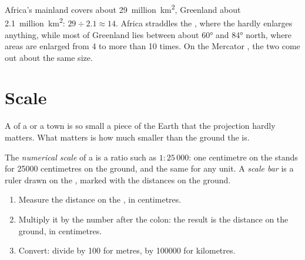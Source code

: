 \begin{example}
Africa's mainland covers about 29~million~\unit{km^2}, Greenland about
2.1~million~\unit{km^2}: $29 \div 2.1 \approx 14$. Africa straddles the
, where the  hardly enlarges anything, while
most of Greenland lies between about \ang{60} and \ang{84} north, where
areas are enlarged from 4 to more than 10 times. On the Mercator , the
two come out about the same size.
\end{example}

\section{Scale}

A  of a  or a town is so small a piece of the Earth that the
projection hardly matters. What matters is how much smaller than the
ground the  is.

\begin{definition}\label{def:g9:maps-of-the-earth:numerical-scale}
The \emph{numerical scale} of a  is a ratio such
as $1 : 25\,000$: one centimetre on the  stands for \num{25000}
centimetres on the ground, and the same for any unit. A \emph{scale
bar} is a ruler drawn on the , marked with the
distances on the ground.
\end{definition}

\begin{method}
\begin{enumerate}
  \item Measure the distance on the , in centimetres.
  \item Multiply it by the number after the colon: the result is the
        distance on the ground, in centimetres.
  \item Convert: divide by 100 for metres, by \num{100000} for kilometres.
\end{enumerate}
\end{method}

